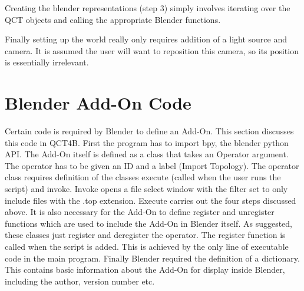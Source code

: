 \documentclass{report}
\begin{document}
Creating the blender representations (step 3) simply involves iterating over the QCT objects and calling the appropriate Blender functions.

Finally setting up the world really only requires addition of a light source and camera.
It is assumed the user will want to reposition this camera, so its position is essentially irrelevant.

\section{Blender Add-On Code}

Certain code is required by Blender to define an Add-On. This section discusses this code in QCT4B.
First the program has to import bpy, the blender python API.
The Add-On itself is defined as a class that takes an Operator argument.
The operator has to be given an ID 
 and a label (Import Topology).
The operator class requires definition of the classes execute (called when the user runs the script)
and invoke.
Invoke opens a file select window with the filter set to only include files with the .top extension.
Execute carries out the four steps discussed above.
It is also necessary for the Add-On to define register and unregister functions which are used to include the Add-On in Blender itself.
As suggested, these classes just register and deregister the operator. The register function is called when the script is added.
This is achieved by the only line of executable code in the main program.
Finally Blender required the definition of a dictionary. %
This contains basic information about the Add-On for display inside Blender, including the author, version number etc.
\end{document}
